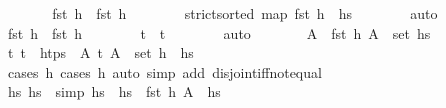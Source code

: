 \begin{isabellebody}
\ \ \ \ \isamarkupfalse%
\ \isamarkupfalse%
\ {\isachardoublequoteopen}fst\ h{}\ {\isasymnoteq}\ fst\ h{\isachardoublequoteclose}\isanewline
\ \ \ \ \ \ \isamarkupfalse%
\ {\isacartoucheopen}strict{\isacharunderscore}{\kern0pt}sorted\ {\isacharparenleft}{\kern0pt}map\ fst\ {\isacharparenleft}{\kern0pt}h\ {\isacharhash}{\kern0pt}\ hs{}{\isacharparenright}{\kern0pt}{\isacharparenright}{\kern0pt}{\isacartoucheclose}\isanewline
\ \ \ \ \ \ \isamarkupfalse%
\ auto\isanewline
\ \ \ \ \isamarkupfalse%
\ {\isachardoublequoteopen}fst\ h{}\ {\isasymnoteq}\ fst\ h{\isacharprime}{\kern0pt}{\isachardoublequoteclose}\isanewline
\ \ \ \ \ \ \isamarkupfalse%
\ {\isacartoucheopen}t\ {\isacharequal}{\kern0pt}\ t{\isacharprime}{\kern0pt}{\isacartoucheclose}\isanewline
\ \ \ \ \ \ \isamarkupfalse%
\ auto\isanewline
\ \ \ \ \isamarkupfalse%
\ \isamarkupfalse%
\ A{}{\isacharprime}{\kern0pt}\ \ {\isachardoublequoteopen}{\isacharparenleft}{\kern0pt}fst\ h{}{\isacharcomma}{\kern0pt}\ A{}{\isacharprime}{\kern0pt}{\isacharparenright}{\kern0pt}\ {\isasymin}\ set\ hs{}{\isacharprime}{\kern0pt}{\isachardoublequoteclose}\isanewline
\ \ \ \ \ \ \isamarkupfalse%
\ {\isacartoucheopen}{\isasymAnd}t{\isachardot}{\kern0pt}\ t\ {\isasymin}\ htps\ {\isasymLongrightarrow}\ {\isasymexists}A{\isachardot}{\kern0pt}\ {\isacharparenleft}{\kern0pt}t{\isacharcomma}{\kern0pt}\ A{\isacharparenright}{\kern0pt}\ {\isasymin}\ set\ {\isacharparenleft}{\kern0pt}h{\isacharprime}{\kern0pt}\ {\isacharhash}{\kern0pt}\ hs{}{\isacharprime}{\kern0pt}{\isacharparenright}{\kern0pt}{\isacartoucheclose}\isanewline
\ \ \ \ \ \ \isamarkupfalse%
\ {\isacharparenleft}{\kern0pt}cases\ h{}{\isacharcomma}{\kern0pt}\ cases\ h{\isacharprime}{\kern0pt}{\isacharcomma}{\kern0pt}\ auto\ simp\ add{\isacharcolon}{\kern0pt}\ disjoint{\isacharunderscore}{\kern0pt}iff{\isacharunderscore}{\kern0pt}not{\isacharunderscore}{\kern0pt}equal{\isacharparenright}{\kern0pt}\isanewline
\ \ \ \ \isamarkupfalse%
\ \isamarkupfalse%
\ hs{}{\isacharprime}{\kern0pt}\ hs{}{\isacharprime}{\kern0pt}\ \ {\isacharbrackleft}{\kern0pt}simp{\isacharbrackright}{\kern0pt}{\isacharcolon}{\kern0pt}\ {\isachardoublequoteopen}hs{}{\isacharprime}{\kern0pt}\ {\isacharequal}{\kern0pt}\ hs{}{\isacharprime}{\kern0pt}\ {\isacharat}{\kern0pt}\ {\isacharparenleft}{\kern0pt}fst\ h{}{\isacharcomma}{\kern0pt}\ A{}{\isacharprime}{\kern0pt}{\isacharparenright}{\kern0pt}\ {\isacharhash}{\kern0pt}\ hs{}{\isacharprime}{\kern0pt}{\isachardoublequoteclose}\isanewline

\end{isabellebody}
